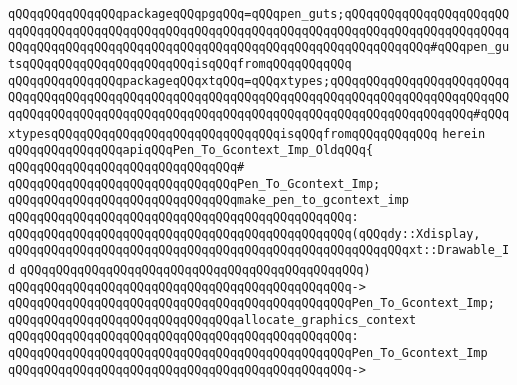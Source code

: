 \verb|qQQqqQQqqQQqqQQqpackageqQQqpgqQQq=qQQqpen_guts;qQQqqQQqqQQqqQQqqQQqqQQqqQQqqQQqqQQqqQQqqQQqqQQqqQQqqQQqqQQqqQQqqQQqqQQqqQQqqQQqqQQqqQQqqQQqqQQqqQQqqQQqqQQqqQQqqQQqqQQqqQQqqQQqqQQqqQQqqQQqqQQqqQQqqQQq#qQQqpen_gutsqQQqqQQqqQQqqQQqqQQqqQQqisqQQqfromqQQqqQQqqQQq|\newline
\verb|qQQqqQQqqQQqqQQqpackageqQQqxtqQQq=qQQqxtypes;qQQqqQQqqQQqqQQqqQQqqQQqqQQqqQQqqQQqqQQqqQQqqQQqqQQqqQQqqQQqqQQqqQQqqQQqqQQqqQQqqQQqqQQqqQQqqQQqqQQqqQQqqQQqqQQqqQQqqQQqqQQqqQQqqQQqqQQqqQQqqQQqqQQqqQQqqQQqqQQq#qQQqxtypesqQQqqQQqqQQqqQQqqQQqqQQqqQQqqQQqisqQQqfromqQQqqQQqqQQq|\newline
\verb|herein|\newline
\newline
\verb|qQQqqQQqqQQqqQQqapiqQQqPen_To_Gcontext_Imp_OldqQQq{|\newline
\verb|qQQqqQQqqQQqqQQqqQQqqQQqqQQqqQQq#|\newline
\verb|qQQqqQQqqQQqqQQqqQQqqQQqqQQqqQQqPen_To_Gcontext_Imp;|\newline
\newline
\verb|qQQqqQQqqQQqqQQqqQQqqQQqqQQqqQQqmake_pen_to_gcontext_imp|\newline
\verb|qQQqqQQqqQQqqQQqqQQqqQQqqQQqqQQqqQQqqQQqqQQqqQQq:|\newline
\verb|qQQqqQQqqQQqqQQqqQQqqQQqqQQqqQQqqQQqqQQqqQQqqQQq(qQQqdy::Xdisplay,|\newline
\verb|qQQqqQQqqQQqqQQqqQQqqQQqqQQqqQQqqQQqqQQqqQQqqQQqqQQqqQQqxt::Drawable_Id|\newline
\verb|qQQqqQQqqQQqqQQqqQQqqQQqqQQqqQQqqQQqqQQqqQQqqQQq)|\newline
\verb|qQQqqQQqqQQqqQQqqQQqqQQqqQQqqQQqqQQqqQQqqQQqqQQq->|\newline
\verb|qQQqqQQqqQQqqQQqqQQqqQQqqQQqqQQqqQQqqQQqqQQqqQQqPen_To_Gcontext_Imp;|\newline
\newline
\newline
\verb|qQQqqQQqqQQqqQQqqQQqqQQqqQQqqQQqallocate_graphics_context|\newline
\verb|qQQqqQQqqQQqqQQqqQQqqQQqqQQqqQQqqQQqqQQqqQQqqQQq:|\newline
\verb|qQQqqQQqqQQqqQQqqQQqqQQqqQQqqQQqqQQqqQQqqQQqqQQqPen_To_Gcontext_Imp|\newline
\verb|qQQqqQQqqQQqqQQqqQQqqQQqqQQqqQQqqQQqqQQqqQQqqQQq->|\newline
